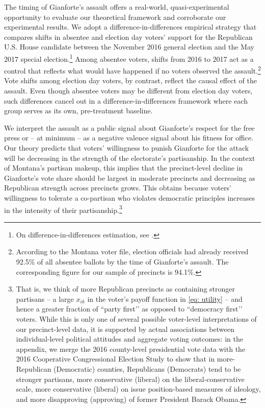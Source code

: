 \documentclass[letterpaper, 12pt]{article}
\begin{document}
\begin{raggedright}
The timing of Gianforte's assault offers a real-world, quasi-experimental opportunity to evaluate our theoretical framework and corroborate our experimental results. We adopt a difference-in-differences empirical strategy that compares shifts in absentee and election day voters’ support for the Republican U.S. House candidate between the November 2016 general election and the May 2017 special election.\footnote{On difference-in-differences estimation, see \citet{Bertrand2004}.} Among absentee voters, shifts from 2016 to 2017 act as a control that reflects what would have happened if no voters observed the assault.\footnote{According to the Montana voter file, election officials had already received 92.5\% of all absentee ballots by the time of Gianforte's assault. The corresponding figure for our sample of precincts is 94.1\%.} Vote shifts among election day voters, by contrast, reflect the causal effect of the assault. Even though absentee voters may be different from election day voters, such differences cancel out in a difference-in-differences framework where each group serves as its own, pre-treatment baseline.

We interpret the assault as a public signal about Gianforte's respect for the free press or -- at minimum -- as a negative valence signal about his fitness for office. Our theory predicts that voters' willingness to punish Gianforte for the attack will be decreasing in the strength of the electorate's partisanship. In the context of Montana's partisan makeup, this implies that the precinct-level decline in Gianforte's vote share should be largest in moderate precincts and decreasing as Republican strength across precincts grows. This obtains because voters' willingness to tolerate a co-partisan who violates democratic principles increases in the intensity of their partisanship.\footnote{That is, we think of more Republican precincts as containing stronger partisans -- a large $x_{ik}$ in the voter's payoff function in \eqref{eq: utility} – and hence a greater fraction of ``party first’’ as opposed to ``democracy first’’ voters. While this is only one of several possible voter-level interpretations of our precinct-level data, it is supported by actual associations between individual-level political attitudes and aggregate voting outcomes: in the appendix, we merge the 2016 county-level presidential vote data with the 2016 Cooperative Congressional Election Study to show that in more-Republican (Democratic) counties, Republicans (Democrats) tend to be stronger partisans, more conservative (liberal) on the liberal-conservative scale, more conservative (liberal) on issue position-based measures of ideology, and more disapproving (approving) of former President Barack Obama.}


\end{raggedright}
\end{document}
